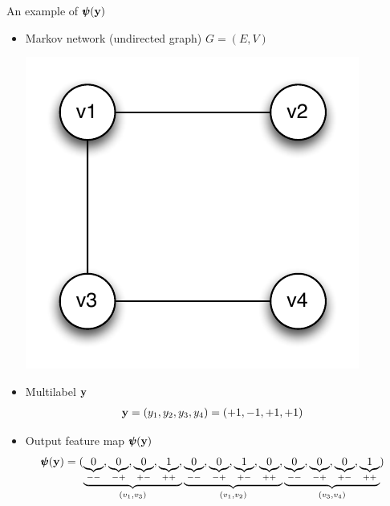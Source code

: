 \documentclass[first=dgreen,second=purple,logo=red]{aaltoslides}
\begin{document}
%
\begin{frame}{An example of $\pmb \psi(\mathbf {y})$}
	\begin{itemize}\footnotesize
		\item Markov network (undirected graph) $G=(E,V)$
		\begin{center}
			\includegraphics[scale=0.3]{./figures/outputgraph.pdf}
		\end{center}
		\item Multilabel $\mathbf {y}$
		\begin{align*}
			\mathbf {y}&=(y_1,y_2,y_3,y_4)=(+1,-1,+1,+1)
		\end{align*}
		\item Output feature map $\pmb \psi(\mathbf {y})$
		\begin{align*}
			\pmb \psi(\mathbf {y}) &= ( \underbrace{\underbrace{0}_{--}, \underbrace{0}_{-+}, \underbrace{0}_{+-}, \underbrace{1}_{++},}_{(v_1,v_3)} 
			\underbrace{\underbrace{0}_{--}, \underbrace{0}_{-+}, \underbrace{1}_{+-}, \underbrace{0}_{++},}_{(v_1,v_2)}
			\underbrace{\underbrace{0}_{--}, \underbrace{0}_{-+}, \underbrace{0}_{+-}, \underbrace{1}_{++}}_{(v_3,v_4)})
		\end{align*}
	\end{itemize}
\end{frame}
\end{document}
